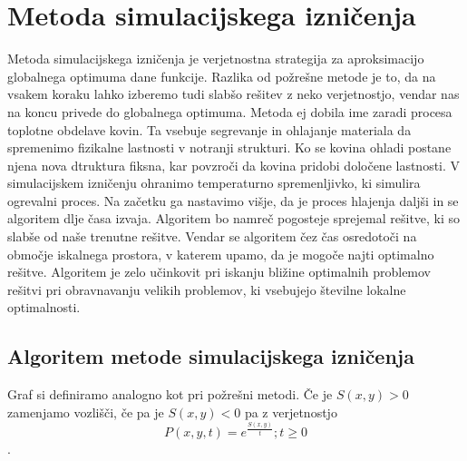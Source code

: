 \documentclass[12pt,a4paper]{amsart}
\theoremstyle{definition} %
\theoremstyle{plain} %
\begin{document}
\section{Metoda simulacijskega izničenja}
Metoda simulacijskega izničenja je verjetnostna strategija za aproksimacijo globalnega optimuma dane funkcije. Razlika od požrešne metode je to, da na vsakem koraku lahko izberemo tudi slabšo rešitev z neko verjetnostjo, vendar nas na koncu privede do globalnega optimuma.  
Metoda ej dobila ime zaradi procesa toplotne obdelave kovin. Ta vsebuje segrevanje in ohlajanje materiala da spremenimo fizikalne lastnosti v notranji strukturi. Ko se kovina ohladi postane njena nova dtruktura fiksna, kar povzroči da kovina pridobi določene lastnosti. V simulacijskem izničenju ohranimo temperaturno spremenljivko, ki simulira ogrevalni proces. Na začetku ga nastavimo višje, da je proces hlajenja daljši in se algoritem dlje časa izvaja. Algoritem bo namreč pogosteje sprejemal rešitve, ki so slabše od naše trenutne rešitve. Vendar se algoritem čez čas osredotoči na območje iskalnega prostora, v katerem upamo, da je mogoče najti optimalno rešitve. Algoritem je zelo učinkovit pri iskanju bližine optimalnih problemov rešitvi pri obravnavanju velikih problemov, ki vsebujejo številne lokalne optimalnosti. 

\subsection{Algoritem metode simulacijskega izničenja}
Graf si definiramo analogno kot pri požrešni metodi. Če je $S(x,y)>0$ zamenjamo vozlišči, če pa je $S(x,y)<0$ pa z verjetnostjo $$P(x,y,t) = e^{\frac{S(x,y)}{t}}; t\ge 0$$.
\end{document}
